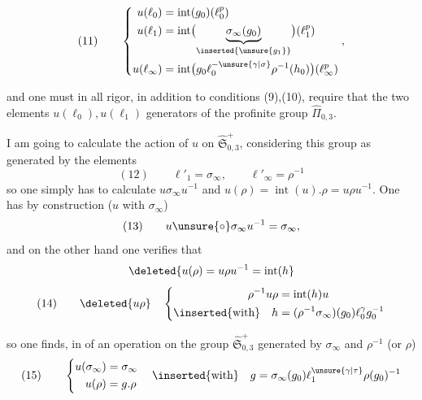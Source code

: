 
\[
(11)\qquad
\left\{
\begin{aligned}
u(\ell_0)&=\operatorname{int}(g_0)(\ell_0^p)\\
u(\ell_1)&=\operatorname{int}\bigl(\underbrace{\sigma_\infty(g_0)}_{\inserted{\unsure{g_1}}}\bigr)(\ell_1^p)\\
u(\ell_\infty)&=\operatorname{int}\bigl(g_0\ell_0^{-\unsure{\gamma|\sigma}}\rho^{-1}(h_0)\bigr)(\ell_\infty^p)
\end{aligned}
\right.,
\]

and one must in all rigor, in addition to conditions (9),(10), require that the two elements $u(\ell_0),u(\ell_1)$   generators of the profinite group $\widehat{\Pi}_{0,3}$.

I am going to calculate the action of $u$ on $\widehat{\mathfrak S}_{0,3}^{+}$, considering this group as generated by the elements
\[
(12)\qquad \ell'_1=\sigma_\infty,\qquad \ell'_\infty=\rho^{-1}
\]
so one simply has to calculate  $u\sigma_\infty u^{-1}$ and $u(\rho)=\operatorname{int}(u).\rho=u\rho u^{-1}$. One has by construction ($u$  with $\sigma_\infty$)
\[
(13)\qquad u\unsure{\circ}\sigma_\infty u^{-1}=\sigma_\infty,
\]
and on the other hand one verifies that
\[
\deleted{u(\rho)=u\rho u^{-1}=\operatorname{int}(h}
\]
\[
(14)\qquad \deleted{u\rho}\quad
\left\{
\begin{aligned}
\rho^{-1}u\rho&=\operatorname{int}(h)u\\
\inserted{\text{with}}\quad h&=(\rho^{-1}\sigma_\infty)(g_0)\ell_0^{\gamma}g_0^{-1}
\end{aligned}
\right.
\]

so one finds, in  of an operation on the group $\widehat{\mathfrak S}_{0,3}^{+}$ generated by $\sigma_\infty$ and $\rho^{-1}$ (or $\rho$)
\[
(15)\qquad
\left\{
\begin{aligned}
u(\sigma_\infty)&=\sigma_\infty\\
u(\rho)&=g.\rho
\end{aligned}
\right.
\quad\inserted{\text{with}}\quad
 g=\sigma_\infty(g_0)\ell_1^{\unsure{\gamma|\tau}}\rho(g_0)^{-1}
\]

